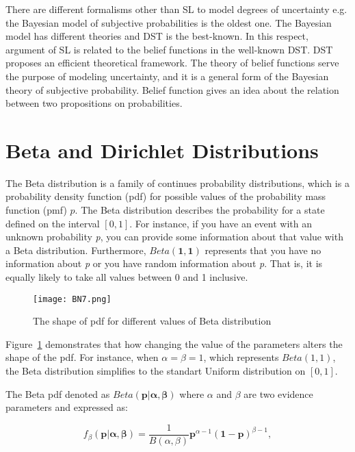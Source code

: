\documentclass[a4,12pt]{ozu-thesis}
\begin{document}
There are different formalisms other than SL to model degrees of uncertainty e.g. the Bayesian model of subjective probabilities is the oldest one. The Bayesian model has different theories and DST is the best-known. In this respect, argument of SL is related to the belief functions in the well-known DST. DST proposes an efficient theoretical framework. The theory of belief functions serve the purpose of modeling uncertainty, and it is a general form of the Bayesian theory of subjective probability. Belief function gives an idea about the relation between two propositions on probabilities.

\section{Beta and Dirichlet Distributions}
The  Beta distribution is a family of continues probability distributions, which is a probability density function (pdf) for possible values of the probability mass function (pmf) $\textit{p}$. The Beta distribution describes the probability for a state defined on the interval $\left [ 0, 1 \right ]$. For instance, if you have an event with an unknown probability \textit{p}, you can provide some information about that value with a Beta distribution. Furthermore, $Beta\left ( \mathbf{1, 1} \right )$ represents that you have no information about \textit{p} or you have random information about \textit{p}. That is, it is equally likely to take all values between 0 and 1 inclusive. 

\begin{figure}[h]
\begin{center}
\texttt{[image: BN7.png]}
\end{center}
\caption{The shape of pdf for different values of Beta distribution}
\label{fig:pdf}
\end{figure}

Figure~\ref{fig:pdf} demonstrates that how changing the value of the parameters alters the shape of the pdf. For instance, when $\alpha = \beta = 1$, which represents $Beta(1, 1)$, the Beta distribution simplifies to the standart Uniform distribution on $\left [ 0, 1 \right ]$.
  

The Beta pdf denoted as $Beta\left ( \mathbf{p|\alpha, \beta} \right )$ where $\alpha$ and $\beta$ are two evidence parameters and expressed as:

\begin{equation}
f_{\beta }\left ( \mathbf{p|\alpha,\beta} \right ) = \frac{1}{B\left ( \alpha, \beta \right )}\mathbf{p}^{\alpha-1}\left ( \mathbf{1-p} \right )^{\beta-1},
\end{equation}
\end{document}
